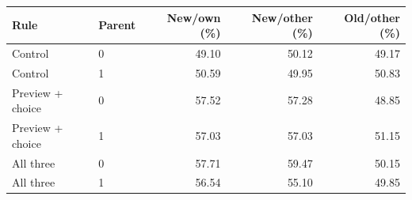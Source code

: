 \begin{tabular}{llrrr}
\toprule
Rule & Parent & New/own (\%) & New/other (\%) & Old/other (\%) \\
\midrule
Control & 0 & 49.10 & 50.12 & 49.17 \\
Control & 1 & 50.59 & 49.95 & 50.83 \\
Preview + choice & 0 & 57.52 & 57.28 & 48.85 \\
Preview + choice & 1 & 57.03 & 57.03 & 51.15 \\
All three & 0 & 57.71 & 59.47 & 50.15 \\
All three & 1 & 56.54 & 55.10 & 49.85 \\
\bottomrule
\end{tabular}
